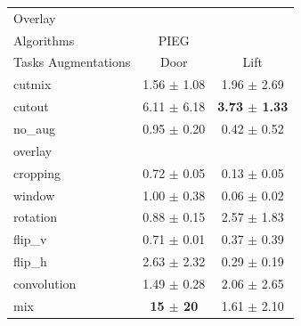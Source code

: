 \begin{tabular}{lcc}
Overlay & & \\
Algorithms & PIEG & \\
Tasks Augmentations & Door & Lift \\
cutmix          & 1.56 $\pm$ 1.08 & 1.96 $\pm$ 2.69 \\
cutout          & 6.11 $\pm$ 6.18 & \textbf{3.73 $\pm$ 1.33} \\
no\_aug         & 0.95 $\pm$ 0.20 & 0.42 $\pm$ 0.52 \\
overlay         &  &  \\
cropping        & 0.72 $\pm$ 0.05 & 0.13 $\pm$ 0.05 \\
window          & 1.00 $\pm$ 0.38 & 0.06 $\pm$ 0.02 \\
rotation        & 0.88 $\pm$ 0.15 & 2.57 $\pm$ 1.83 \\
flip\_v         & 0.71 $\pm$ 0.01 & 0.37 $\pm$ 0.39 \\
flip\_h         & 2.63 $\pm$ 2.32 & 0.29 $\pm$ 0.19 \\
convolution     & 1.49 $\pm$ 0.28 & 2.06 $\pm$ 2.65 \\
mix             & \textbf{15 $\pm$ 20} & 1.61 $\pm$ 2.10 \\
\end{tabular}